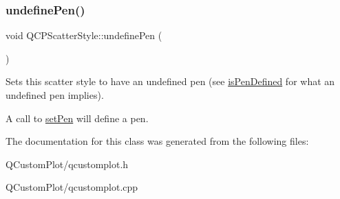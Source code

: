 \subsubsection{\texorpdfstring{undefine\+Pen()}{undefinePen()}}
{\footnotesize\ttfamily void Q\+C\+P\+Scatter\+Style\+::undefine\+Pen (\begin{DoxyParamCaption}{ }\end{DoxyParamCaption})}

Sets this scatter style to have an undefined pen (see \mbox{\hyperlink{class_q_c_p_scatter_style_a47077eb6450fe9a788f833e4ec1b1d5a}{is\+Pen\+Defined}} for what an undefined pen implies).

A call to \mbox{\hyperlink{class_q_c_p_scatter_style_a761f1f229cc0ca4703e1e2b89f6dd1ba}{set\+Pen}} will define a pen. 

The documentation for this class was generated from the following files\+:\begin{DoxyCompactItemize}
\item 
Q\+Custom\+Plot/qcustomplot.\+h\item 
Q\+Custom\+Plot/qcustomplot.\+cpp\end{DoxyCompactItemize}
